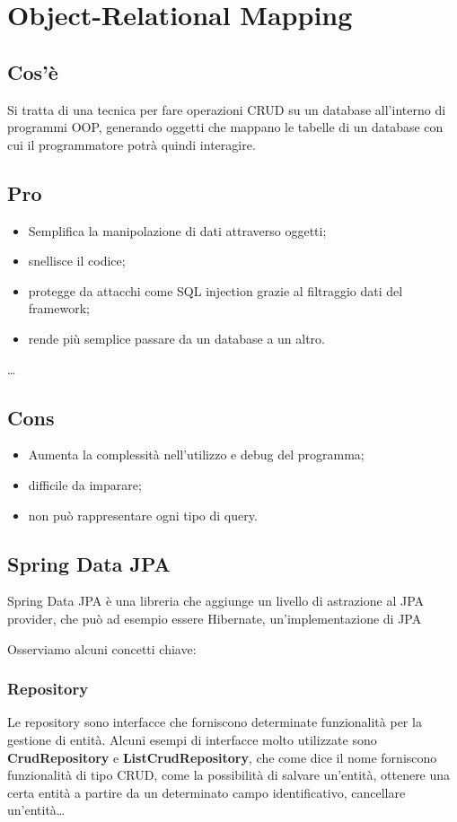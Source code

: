 \chapter{Object-Relational Mapping}
\section{Cos'è}
Si tratta di una tecnica per fare operazioni CRUD su un database all'interno di programmi OOP, generando oggetti che mappano le tabelle di un database con cui il programmatore potrà quindi interagire. 

\section{Pro}
\begin{itemize}
    \item Semplifica la manipolazione di dati attraverso oggetti;
    \item snellisce il codice;
    \item protegge da attacchi come SQL injection grazie al filtraggio dati del framework;
    \item rende più semplice passare da un database a un altro.
\end{itemize}

\dots

\section{Cons}
\begin{itemize}
    \item Aumenta la complessità nell'utilizzo e debug del programma;
    \item difficile da imparare;
    \item non può rappresentare ogni tipo di query.
\end{itemize}

\section{Spring Data JPA}
Spring Data JPA è una libreria che aggiunge un livello di astrazione al JPA provider, che può ad esempio essere Hibernate, un'implementazione di JPA\@

Osserviamo alcuni concetti chiave:

\subsection{Repository}
Le repository sono interfacce che forniscono determinate funzionalità per la gestione di entità. Alcuni esempi di interfacce molto utilizzate sono \textbf{CrudRepository} e \textbf{ListCrudRepository}, che come dice il nome forniscono funzionalità di tipo CRUD, come la possibilità di salvare un'entità, ottenere una certa entità a partire da un determinato campo identificativo, cancellare un'entità\dots

